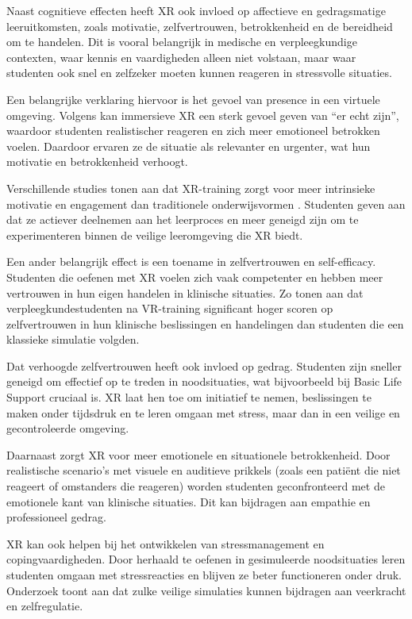 Naast cognitieve effecten heeft XR ook invloed op affectieve en gedragsmatige leeruitkomsten, zoals motivatie, zelfvertrouwen, betrokkenheid en de bereidheid om te handelen. Dit is vooral belangrijk in medische en verpleegkundige contexten, waar kennis en vaardigheden alleen niet volstaan, maar waar studenten ook snel en zelfzeker moeten kunnen reageren in stressvolle situaties.

Een belangrijke verklaring hiervoor is het gevoel van presence in een virtuele omgeving. Volgens \textcite{Slater2009PlaceIllusion} kan immersieve XR een sterk gevoel geven van ``er echt zijn'', waardoor studenten realistischer reageren en zich meer emotioneel betrokken voelen. Daardoor ervaren ze de situatie als relevanter en urgenter, wat hun motivatie en betrokkenheid verhoogt.

Verschillende studies tonen aan dat XR-training zorgt voor meer intrinsieke motivatie en engagement dan traditionele onderwijsvormen \autocite{Fowler2015VR}. Studenten geven aan dat ze actiever deelnemen aan het leerproces en meer geneigd zijn om te experimenteren binnen de veilige leeromgeving die XR biedt.

Een ander belangrijk effect is een toename in zelfvertrouwen en self-efficacy. Studenten die oefenen met XR voelen zich vaak competenter en hebben meer vertrouwen in hun eigen handelen in klinische situaties. Zo tonen \textcite{Padilha2019VR} aan dat verpleegkundestudenten na VR-training significant hoger scoren op zelfvertrouwen in hun klinische beslissingen en handelingen dan studenten die een klassieke simulatie volgden.

Dat verhoogde zelfvertrouwen heeft ook invloed op gedrag. Studenten zijn sneller geneigd om effectief op te treden in noodsituaties, wat bijvoorbeeld bij Basic Life Support cruciaal is. XR laat hen toe om initiatief te nemen, beslissingen te maken onder tijdsdruk en te leren omgaan met stress, maar dan in een veilige en gecontroleerde omgeving.

Daarnaast zorgt XR voor meer emotionele en situationele betrokkenheid. Door realistische scenario’s met visuele en auditieve prikkels (zoals een patiënt die niet reageert of omstanders die reageren) worden studenten geconfronteerd met de emotionele kant van klinische situaties. Dit kan bijdragen aan empathie en professioneel gedrag.

XR kan ook helpen bij het ontwikkelen van stressmanagement en copingvaardigheden. Door herhaald te oefenen in gesimuleerde noodsituaties leren studenten omgaan met stressreacties en blijven ze beter functioneren onder druk. Onderzoek toont aan dat zulke veilige simulaties kunnen bijdragen aan veerkracht en zelfregulatie.

